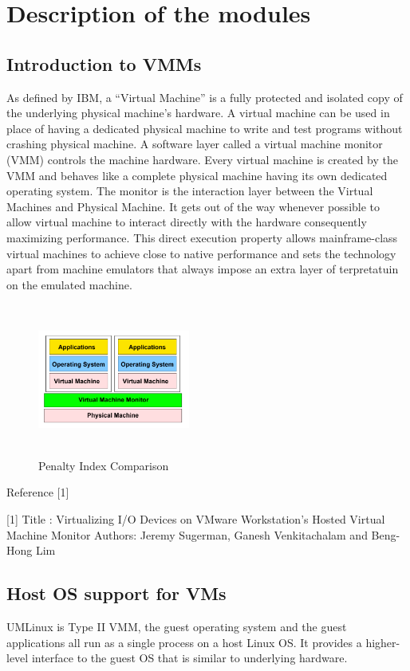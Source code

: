 \documentclass[runningheads]{llncs}
\begin{document}
%
%
\section{Description of the modules}
\subsection{Introduction to VMMs}
As defined by IBM, a “Virtual Machine” is a fully protected and isolated copy of the underlying physical machine’s hardware. A virtual machine can be used in place of having a dedicated physical machine to write and test programs without crashing physical machine.
A software layer called a virtual machine monitor (VMM) controls the machine hardware. Every virtual machine is created by the VMM and behaves like a complete physical machine having its own dedicated operating system.
The monitor is the interaction layer between the Virtual Machines and Physical Machine. It gets out of the way whenever possible to allow virtual machine to interact directly with the hardware consequently maximizing performance. This direct execution property allows mainframe-class virtual machines to achieve close to native performance and sets the technology apart from machine emulators that always impose an extra layer of terpretatuin on the emulated machine.

\begin{figure}[H]
 
      \centering
     \includegraphics[width=50mm,height=50mm]{virtual_machine_organisation.png}
     \caption{Penalty Index Comparison}
     \label{fig:galaxy}
  
 \end{figure}

Reference [1]

[1] Title : Virtualizing I/O Devices on VMware Workstation’s Hosted Virtual Machine Monitor
    Authors: Jeremy Sugerman, Ganesh Venkitachalam and Beng-Hong Lim

\subsection{Host OS support for VMs}
UMLinux is Type II VMM, the guest operating system and the guest applications all run as a single process on a host Linux OS. It provides a higher-level interface to the guest OS that is similar to underlying hardware.
\end{document}
